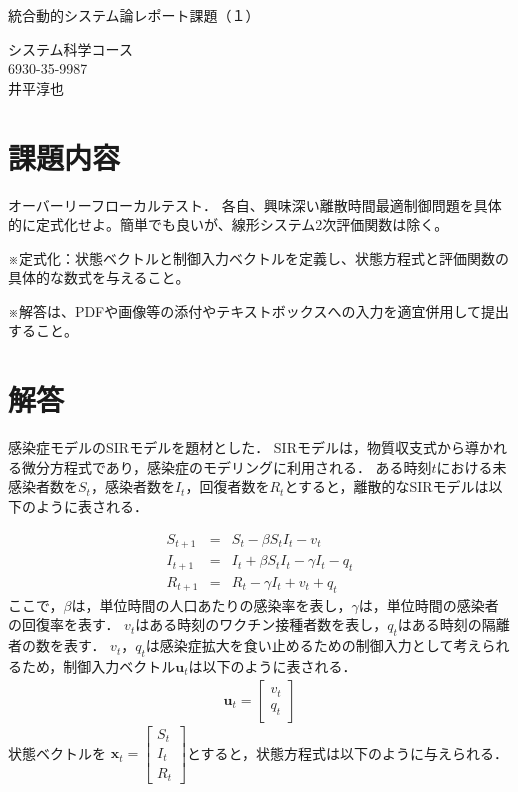 \documentclass[a4j,onecolumn,10pt]{jresume}
\begin{document}
\renewcommand{\refname}{References}
\renewcommand{\abstractname}{Abstract}
%
\medskip
\begin{center}
{\Large 統合動的システム論レポート課題（１）}
\end{center}

%
\begin{flushright}
システム科学コース \\
6930-35-9987 \\
井平淳也 \\
\end{flushright}
\medskip
%



\section{課題内容}\label{sec:intro}
オーバーリーフローカルテスト．
各自、興味深い離散時間最適制御問題を具体的に定式化せよ。簡単でも良いが、線形システム2次評価関数は除く。

※定式化：状態ベクトルと制御入力ベクトルを定義し、状態方程式と評価関数の具体的な数式を与えること。

※解答は、PDFや画像等の添付やテキストボックスへの入力を適宜併用して提出すること。

\section{解答}
感染症モデルのSIRモデルを題材とした．
SIRモデルは，物質収支式から導かれる微分方程式であり，感染症のモデリングに利用される．
ある時刻$t$における未感染者数を$S_t$，感染者数を$I_t$，回復者数を$R_t$とすると，離散的なSIRモデルは以下のように表される．

\begin{eqnarray}
    S_{t+1} &=& S_t - \beta S_tI_t -v_t\\
    I_{t+1} &=& I_t + \beta S_tI_t - \gamma I_t -q_t\\
   R_{t+1} &=& R_t - \gamma I_t +v_t + q_t
\end{eqnarray}
ここで，$\beta$は，単位時間の人口あたりの感染率を表し，$\gamma$は，単位時間の感染者の回復率を表す．
$v_t$はある時刻のワクチン接種者数を表し，$q_t$はある時刻の隔離者の数を表す．
$v_t$，$q_t$は感染症拡大を食い止めるための制御入力として考えられるため，制御入力ベクトル$\mathbf{u}_t$は以下のように表される．
\begin{eqnarray}
\mathbf{u}_t =
    \begin{bmatrix}
    v_t \\ q_t
    \end{bmatrix}
\end{eqnarray}
状態ベクトルを
$\mathbf{x}_t =
    \begin{bmatrix}
    S_t \\
    I_t \\
    R_t
    \end{bmatrix}$とすると，状態方程式は以下のように与えられる．
\end{document}
